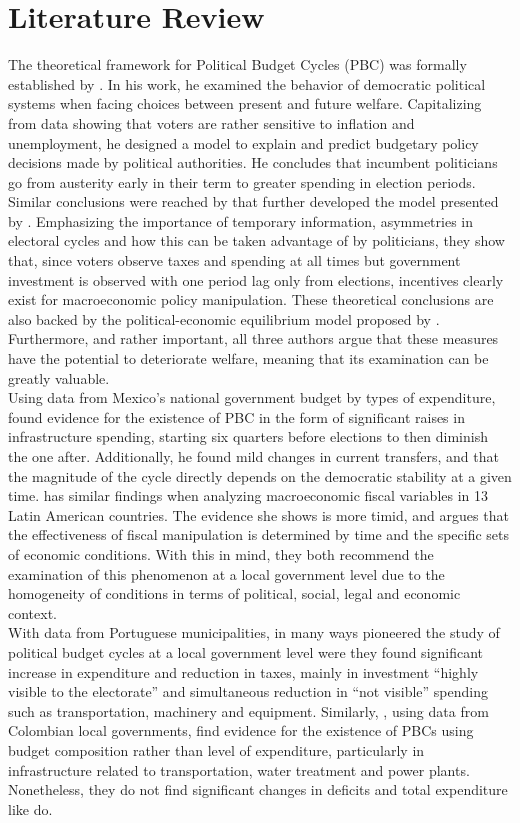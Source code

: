 \section{Literature Review}
The theoretical framework for Political Budget Cycles (PBC) was formally established by \textcite{nordhaus1975}. In his work, he examined the behavior of democratic political systems when facing choices between present and future welfare. Capitalizing from data showing that voters are rather sensitive to inflation and unemployment, he designed a model to explain and predict budgetary policy decisions made by political authorities. He concludes that incumbent politicians go from austerity early in their term to greater spending in election periods. Similar conclusions were reached by \textcite{rogoff1988} that further developed the model presented by \textcite{nordhaus1975}. Emphasizing the importance of temporary information, asymmetries in electoral cycles and how this can be taken advantage of by politicians, they show that, since voters observe taxes and spending at all times but government investment is observed with one period lag only from elections, incentives clearly exist for macroeconomic policy manipulation. These theoretical conclusions are also backed by the political-economic equilibrium model proposed by \textcite{drazen2010}. Furthermore, and rather important, all three authors argue that these measures have the potential to deteriorate welfare, meaning that its examination can be greatly valuable.
\\
Using data from Mexico's national government budget by types of expenditure, \textcite{gonzalez2002} found evidence for the existence of PBC in the form of significant raises in infrastructure spending, starting six quarters before elections to then diminish the one after. Additionally, he found mild changes in current transfers, and that the magnitude of the cycle directly depends on the democratic stability at a given time. \textcite{lankaster2017} has similar findings when analyzing macroeconomic fiscal variables in 13 Latin American countries. The evidence she shows is more timid, and argues that the effectiveness of fiscal manipulation is determined by time and the specific sets of economic conditions. With this in mind, they both recommend the examination of this phenomenon at a local government level due to the homogeneity of conditions in terms of political, social, legal and economic context.
\\
With data from Portuguese municipalities, \textcite{veiga2007} in many ways pioneered the study of political budget cycles at a local government level were they found significant increase in expenditure and reduction in taxes, mainly in investment “highly visible to the electorate” and simultaneous reduction in “not visible” spending such as transportation, machinery and equipment. Similarly, \textcite{drazen2010}, using data from Colombian local governments, find evidence for the existence of PBCs using budget composition rather than level of expenditure, particularly in infrastructure related to transportation, water treatment and power plants. Nonetheless, they do not find significant changes in deficits and total expenditure like \textcite{veiga2007} do.
